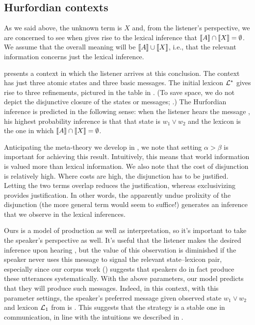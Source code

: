 \documentclass{article}
\begin{document}

\subsection{Hurfordian contexts}\label{sec:analysis:subsumptive}

As we said above, the unknown term is $X$ and, from the listener's
perspective, we are concerned to see when  gives rise to
the lexical inference that $\llbracket A\rrbracket \cap \llbracket X\rrbracket = \emptyset$. We
assume that the overall meaning will be $\llbracket A\rrbracket \cup \llbracket X\rrbracket$, i.e.,
that the relevant information concerns just the lexical inference.

 presents a context in which the listener arrives
at this conclusion. The context has just three atomic states and three
basic messages. The initial lexicon $\mathcal{L}^{\ast}$ gives rise to three
refinements, pictured in the table in . (To save
space, we do not depict the disjunctive closure of the states or
messages; .)  The Hurfordian inference is
predicted in the following sense: when the listener hears the message
, his highest probability inference is that that state is
$w_{1} \vee w_{2}$ and the lexicon is the one in which
$\llbracket A\rrbracket \cap \llbracket X\rrbracket = \emptyset$.

Anticipating the meta-theory we develop in
, we note that setting
$\alpha > \beta$ is important for achieving this result. Intuitively,
this means that world information is valued more than lexical
information. We also note that the cost of disjunction is relatively
high. Where costs are high, the disjunction has to be
justified. Letting the two terms overlap reduces the justification,
whereas exclusivizing provides justification. In other words, the
apparently undue prolixity of the disjunction (the more general term
would seem to suffice!) generates an inference that we observe in the
lexical inferences.

Ours is a model of production as well as interpretation, so it's
important to take the speaker's perspective as well. It's useful that
the listener makes the desired inference upon hearing ,
but the value of this observation is diminished if the speaker never
uses this message to signal the relevant state--lexicon pair,
especially since our corpus work ()
suggests that speakers do in fact produce these utterances
systematically. With the above parameters, our model predicts that
they will produce such messages. Indeed, in this context, with this
parameter settings, the speaker's preferred message given observed
state $w_{1} \vee w_{2}$ and lexicon $\mathcal{L}_{1}$ from
 is .  This suggests that the
strategy is a stable one in communication, in line with the intuitions
we described in .
\end{document}
